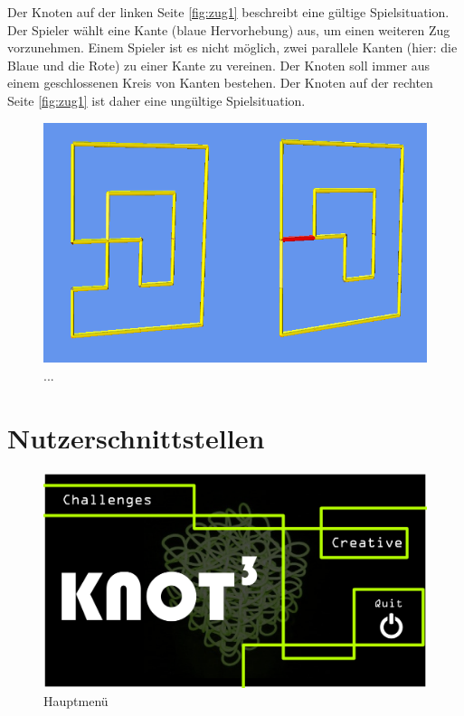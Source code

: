 Der Knoten auf der linken Seite \ref{fig:zug1} beschreibt eine gültige Spielsituation. Der Spieler wählt eine Kante (blaue Hervorhebung) aus, um einen weiteren Zug vorzunehmen.
Einem Spieler ist es nicht möglich, zwei parallele Kanten (hier: die Blaue und die Rote) zu einer Kante zu vereinen. Der Knoten soll immer aus einem geschlossenen Kreis von Kanten bestehen. Der Knoten auf der rechten Seite \ref{fig:zug1} ist daher eine ungültige Spielsituation.



	\begin{figure}[htb]
	  \centering
	  \includegraphics[width = \textwidth]{Systemmodelle/Ungueltiger_Zug2.png}
	  \caption{...}
	  \label{fig:zug2}
	\end{figure}

\clearpage

\section{Nutzerschnittstellen}

	\begin{figure}[ht]
	  \centering
	  \includegraphics[width = \textwidth]{Systemmodelle/01_Knot3-mainscreen.png}
	  \caption{Hauptmenü}
	\end{figure}

